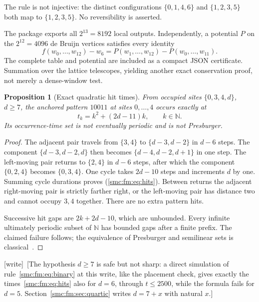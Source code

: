 \documentclass[11pt,letterpaper]{article}
\numberwithin{equation}{section}
\newtheorem{proposition}[theorem]{Proposition}
\theoremstyle{definition}
\theoremstyle{remark}
\newcommand{\NN}{\mathbb N}
\newcommand{\wtag}{\textup{[write]}}
\begin{document}
The rule is not injective: the distinct configurations $\{0,1,4,6\}$ and
$\{1,2,3,5\}$ both map to $\{1,2,3,5\}$. No reversibility is asserted.

The package exports all $2^{13}=8192$ local outputs. Independently, a potential
$P$ on the $2^{12}=4096$ de Bruijn vertices satisfies every identity
\begin{equation}
 f(w_0,\ldots,w_{12})-w_6
 =P(w_1,\ldots,w_{12})-P(w_0,\ldots,w_{11}).       \label{smc:fm:eq:potential}
\end{equation}
The complete table and potential are included as a compact JSON certificate.
Summation over the lattice telescopes, yielding another exact conservation
proof, not merely a dense-window test.

\begin{proposition}[Exact quadratic hit times]\label{smc:fm:prop:hits}
From occupied sites $\{0,3,4,d\}$, $d\ge7$, the anchored pattern $10011$
at sites $0,\ldots,4$ occurs exactly at
\begin{equation}
                 t_k=k^2+(2d-11)k,\qquad k\in\NN. \label{smc:fm:eq:hits}
\end{equation}
Its occurrence-time set is not eventually periodic and is not Presburger.
\end{proposition}
\begin{proof}
The adjacent pair travels from $\{3,4\}$ to $\{d-3,d-2\}$ in $d-6$ steps.
The component $\{d-3,d-2,d\}$ then becomes $\{d-4,d-2,d+1\}$ in one step.
The left-moving pair returns to $\{2,4\}$ in $d-6$ steps, after which the
component $\{0,2,4\}$ becomes $\{0,3,4\}$. One cycle takes $2d-10$ steps
and increments $d$ by one. Summing cycle durations proves (\ref{smc:fm:eq:hits}).
Between returns the adjacent right-moving pair is strictly farther right,
or the left-moving pair has distance two and cannot occupy $3,4$ together.
There are no extra pattern hits.

Successive hit gaps are $2k+2d-10$, which are unbounded. Every infinite
ultimately periodic subset of $\NN$ has bounded gaps after a finite prefix.
The claimed failure follows; the equivalence of Presburger and semilinear sets
is classical~\cite{ginsburgspanier}.
\end{proof}
\wtag\ [The hypothesis $d\ge7$ is safe but not sharp: a direct simulation of rule~\eqref{smc:fm:eq:binary} at this write, like the placement check, gives exactly the times~\eqref{smc:fm:eq:hits} also for $d=6$, through $t\le2500$, while the formula fails for $d=5$. Section~\ref{smc:fm:sec:quartic} writes $d=7+x$ with natural $x$.]
\end{document}
